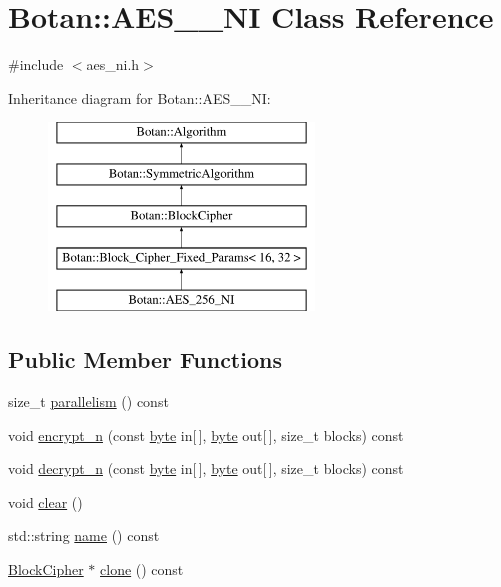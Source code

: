 \hypertarget{classBotan_1_1AES__256__NI}{\section{Botan\-:\-:A\-E\-S\-\_\-\_\-\-N\-I Class Reference}
\label{classBotan_1_1AES__256__NI}
}


{\ttfamily \#include $<$aes\-\_\-ni.\-h$>$}

Inheritance diagram for Botan\-:\-:A\-E\-S\-\_\-\_\-\-N\-I\-:\begin{figure}[H]
\begin{center}
\leavevmode
\includegraphics[height=5.000000cm]{classBotan_1_1AES__256__NI}
\end{center}
\end{figure}
\subsection*{Public Member Functions}
\begin{DoxyCompactItemize}
\item 
size\-\_\-t \hyperlink{classBotan_1_1AES__256__NI_ae1665eab51de52a0fa31d6dddad61bfb}{parallelism} () const 
\item 
void \hyperlink{classBotan_1_1AES__256__NI_a7cd990c84e871b8b23bc27e32671891b}{encrypt\-\_\-n} (const \hyperlink{namespaceBotan_a7d793989d801281df48c6b19616b8b84}{byte} in\mbox{[}$\,$\mbox{]}, \hyperlink{namespaceBotan_a7d793989d801281df48c6b19616b8b84}{byte} out\mbox{[}$\,$\mbox{]}, size\-\_\-t blocks) const 
\item 
void \hyperlink{classBotan_1_1AES__256__NI_a6b46eb6a320cab9433b495bde7328f21}{decrypt\-\_\-n} (const \hyperlink{namespaceBotan_a7d793989d801281df48c6b19616b8b84}{byte} in\mbox{[}$\,$\mbox{]}, \hyperlink{namespaceBotan_a7d793989d801281df48c6b19616b8b84}{byte} out\mbox{[}$\,$\mbox{]}, size\-\_\-t blocks) const 
\item 
void \hyperlink{classBotan_1_1AES__256__NI_a1fe7e44f8f6f02599943e1a38ce9d3a8}{clear} ()
\item 
std\-::string \hyperlink{classBotan_1_1AES__256__NI_a7e106c1e0b9d9dd7527eb1e9eae2e1bc}{name} () const 
\item 
\hyperlink{classBotan_1_1BlockCipher}{Block\-Cipher} $\ast$ \hyperlink{classBotan_1_1AES__256__NI_abfd6af9d37ea5daa5006539d46895df2}{clone} () const 
\end{DoxyCompactItemize}
